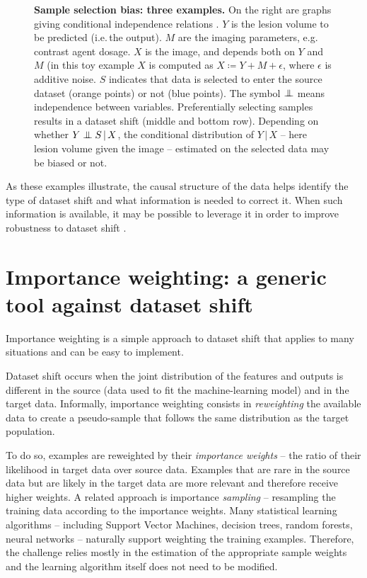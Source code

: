 \documentclass[a4paper,num-refs]{oup-contemporary}
\newcommand{\giv}{ \,|\, }
\newcommand\indep{\protect\mathpalette{\protect\independenT}{\perp}}
\def\independenT#1#2{\mathrel{\rlap{$#1#2$}\mkern3.5mu{#1#2}}}
\newcommand{\eg}{e.g.\,}
\newcommand{\ie}{i.e.\,}
\begin{document}
\begin{figure}
\begin{minipage}{.3\textwidth}
\begin{minipage}{\textwidth}
  \end{minipage}
  \end{minipage}
  \caption{\textbf{Sample selection bias: three examples.}
    On the right are graphs giving conditional independence relations
    \citep{pearl2016causal}.
    \(Y\) is the lesion volume to be predicted (\ie the output).  \(M\) are the imaging
    parameters, \eg contrast agent dosage. \(X\) is the image, and depends both
    on \(Y\) and \(M\) (in this toy example \(X\) is computed as
    \(X \coloneqq Y + M + \epsilon\), where \(\epsilon\) is additive noise.
    \(S\) indicates that data is selected to enter the source dataset (orange
    points) or not (blue points).  The symbol \(\indep\) means independence
    between variables.
    Preferentially selecting samples results in a dataset shift (middle and
    bottom row). Depending on whether \(Y \indep S  \giv X\), the conditional
    distribution of \(Y \giv X\) -- here lesion volume given the image -- estimated on
    the selected data may be biased or not.
}
  \label{fig:sample-selection-bias}

\end{figure}
%
As these examples illustrate, the causal structure of the data helps identify
the type of dataset shift and what information is needed to correct it.
%
When such information is available, it may be possible to leverage it in order to improve robustness to dataset shift \citep[\eg][]{subbaswamy2019preventing}.


\section{Importance weighting: a generic tool against dataset shift}\label{sec:importance-weighting}
Importance weighting is a simple approach to dataset shift that applies to
many situations and can be easy to implement.
%


Dataset shift occurs when the joint distribution of the features and outputs is
different in the source (data used to fit the machine-learning model) and in the target data.
%
Informally, importance weighting consists in \emph{reweighting} the
available data to create a pseudo-sample that follows the same distribution as
the target population.
%

To do so, examples are reweighted by their \emph{importance weights} -- the
ratio of their likelihood in target data over source data. Examples that are 
rare in the source data but are likely in the target data are
more relevant and therefore receive higher weights.
A related approach is importance \emph{sampling} -- resampling the training data according to the importance weights.
%
Many statistical learning algorithms -- including Support Vector Machines,
decision trees, random forests, neural networks -- naturally
support weighting the training examples. Therefore, the challenge relies mostly
in the estimation of the appropriate sample weights and the learning algorithm
itself does not need to be modified.
%
\end{document}
